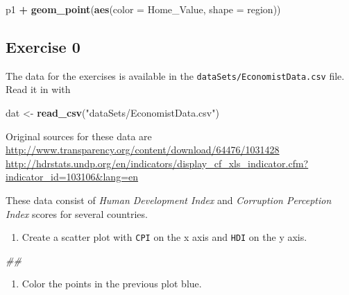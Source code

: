 \documentclass[]{book}
\newenvironment{Shaded}{\begin{snugshade}}{\end{snugshade}}
\newcommand{\CommentTok}[1]{\textcolor[rgb]{0.56,0.35,0.01}{\textit{#1}}}
\newcommand{\DataTypeTok}[1]{\textcolor[rgb]{0.13,0.29,0.53}{#1}}
\newcommand{\KeywordTok}[1]{\textcolor[rgb]{0.13,0.29,0.53}{\textbf{#1}}}
\newcommand{\NormalTok}[1]{#1}
\newcommand{\OperatorTok}[1]{\textcolor[rgb]{0.81,0.36,0.00}{\textbf{#1}}}
\newcommand{\StringTok}[1]{\textcolor[rgb]{0.31,0.60,0.02}{#1}}
\providecommand{\tightlist}{%
  \setlength{\itemsep}{0pt}\setlength{\parskip}{0pt}}
\begin{document}
\begin{Shaded}
\begin{Highlighting}[]
\NormalTok{p1 }\OperatorTok{+}
\StringTok{  }\KeywordTok{geom_point}\NormalTok{(}\KeywordTok{aes}\NormalTok{(}\DataTypeTok{color =}\NormalTok{ Home_Value, }\DataTypeTok{shape =}\NormalTok{ region))}
\end{Highlighting}
\end{Shaded}

\hypertarget{exercise-0-2}{%
\subsection{Exercise 0}\label{exercise-0-2}}

The data for the exercises is available in the \texttt{dataSets/EconomistData.csv} file. Read it in with

\begin{Shaded}
\begin{Highlighting}[]
\NormalTok{dat <-}\StringTok{ }\KeywordTok{read_csv}\NormalTok{(}\StringTok{"dataSets/EconomistData.csv"}\NormalTok{)}
\end{Highlighting}
\end{Shaded}

Original sources for these data are \url{http://www.transparency.org/content/download/64476/1031428} \url{http://hdrstats.undp.org/en/indicators/display_cf_xls_indicator.cfm?indicator_id=103106\&lang=en}

These data consist of \emph{Human Development Index} and \emph{Corruption Perception Index} scores for several countries.

\begin{enumerate}
\def\labelenumi{\arabic{enumi}.}
\tightlist
\item
  Create a scatter plot with \texttt{CPI} on the x axis and \texttt{HDI} on the y axis.
\end{enumerate}

\begin{Shaded}
\begin{Highlighting}[]
\CommentTok{## }
\end{Highlighting}
\end{Shaded}

\begin{enumerate}
\def\labelenumi{\arabic{enumi}.}
\setcounter{enumi}{1}
\tightlist
\item
  Color the points in the previous plot blue.
\end{enumerate}
\end{document}
